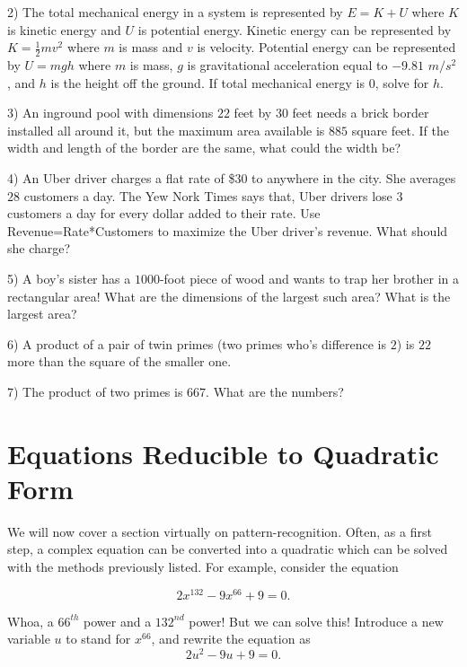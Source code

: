 \documentclass{book}
\theoremstyle{definition}
\begin{document}
2) The total mechanical energy in a system is represented by $E=K+U$ where $K$ is kinetic energy and $U$ is potential energy. Kinetic energy can be represented by $K=\frac{1}{2}mv^2$ where $m$ is mass and $v$ is velocity. Potential energy can be represented by $U=mgh$ where $m$ is mass, $g$ is gravitational acceleration equal to $-9.81$ $m/s^2$, and $h$ is the height off the ground. If total mechanical energy is $0$, solve for $h$.


3) An inground pool with dimensions $22$ feet by $30$ feet needs a brick border installed all around it, but the maximum area available is $885$ square feet. If the width and length of the border are the same, what could the width be?


4) An Uber driver charges a flat rate of \$$30$ to anywhere in the city. She averages $28$ customers a day. The Yew Nork Times says that, Uber drivers lose $3$ customers a day for every dollar added to their rate. Use Revenue=Rate*Customers to maximize the Uber driver’s revenue. What should she charge?


5) A boy's sister has a $1000$-foot piece of wood and wants to trap her brother in a rectangular area! What are the dimensions of the largest such area? What is the largest area?


6) A product of a pair of twin primes (two primes who's difference is $2$) is $22$ more than the square of the smaller one.


7) The product of two primes is $667$. What are the numbers?

\section{Equations Reducible to Quadratic Form}

We will now cover a section virtually on pattern-recognition. Often, as a first step, a complex equation can be converted into a quadratic which can be solved with the methods previously listed. For example, consider the equation

\begin{equation}
\label{(8.1)}
2x^{132}-9x^{66}+9=0.
\end{equation}

Whoa, a $66^{th}$ power and a $132^{nd}$ power! But we can solve this! Introduce a new variable $u$ to stand for $x^{66}$, and rewrite the equation as
\begin{equation}
\label{(8.2)}
2u^2-9u+9=0.               
\end{equation}
                     
\end{document}
